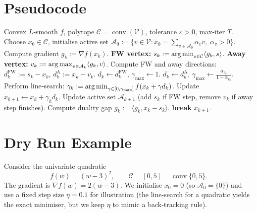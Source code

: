 \documentclass{article}
\newcommand{\gap}{g}
\newcommand{\conv}{\operatorname{conv}}
\newcommand{\argmin}{\operatornamewithlimits{arg\,min}}
\newcommand{\argmax}{\operatornamewithlimits{arg\,max}}
\newcommand{\C}{\mathcal{C}}
\newcommand{\V}{\mathcal{V}}
\newcommand{\A}{\mathcal{A}}
\begin{document}
\section*{Pseudocode}
\begin{algorithm}[H]
\caption{Away‑step Frank‑Wolfe (AFW)}\label{alg:afw}
\begin{algorithmic}[1]
\Require Convex $L$‑smooth $f$, polytope $\C=\conv(\V)$, tolerance $\varepsilon>0$, max‑iter $T$.
\State Choose $x_0\in\C$, initialise active set $\A_0:=\{v\in\V: x_0=\sum_{v\in\A_0}\alpha_v v,\;\alpha_v>0\}$.
    \State Compute gradient $g_k:=\nabla f(x_k)$.
    \State \textbf{FW vertex:} $s_k:=\argmin_{s\in\C}\langle g_k,s\rangle$.
    \State \textbf{Away vertex:} $v_k:=\argmax_{v\in\A_k}\langle g_k,v\rangle$.
    \State Compute FW and away directions:
          $d^{\text{FW}}_k:=s_k-x_k$, $d^{\text{A}}_k:=x_k-v_k$.
        \State $d_k\gets d^{\text{FW}}_k$, $\gamma_{\max}\gets 1$.
    \Else
        \State $d_k\gets d^{\text{A}}_k$, $\gamma_{\max}\gets \frac{\alpha_{v_k}}{1-\alpha_{v_k}}$.
    \EndIf
    \State Perform line‑search:
          $\gamma_k:=\argmin_{\gamma\in[0,\gamma_{\max}]} f(x_k+\gamma d_k)$.
    \State Update $x_{k+1}\gets x_k+\gamma_k d_k$.
    \State Update active set $\A_{k+1}$ (add $s_k$ if FW step, remove $v_k$ if away step finishes).
    \State Compute duality gap $\gap_k:=\langle g_k, x_k-s_k\rangle$.
    \If{$\gap_k\le\varepsilon$}
        \State \textbf{break}
    \EndIf
\EndFor
\State \Return $x_{k+1}$.
\end{algorithmic}
\end{algorithm}

\section*{Dry Run Example}
Consider the univariate quadratic
\[
f(w)=(w-3)^2,\qquad \C=[0,5]=\conv\{0,5\}.
\]
The gradient is $\nabla f(w)=2(w-3)$.  
We initialise $x_0=0$ (so $\A_0=\{0\}$) and use a fixed step size $\eta=0.1$ for illustration (the line‑search for a quadratic yields the exact minimiser, but we keep $\eta$ to mimic a back‑tracking rule).
\end{document}
